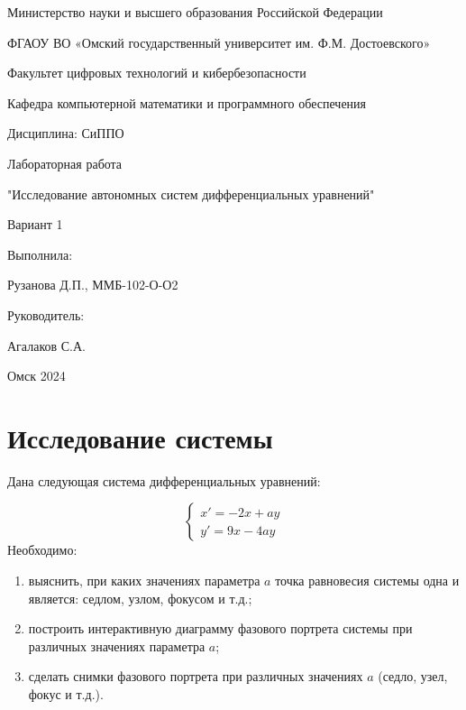 \documentclass[fleqn, 14pt]{article}
\begin{document}
\thispagestyle{empty}
\begin{center}
\setlength{\baselineskip}{8pt}

Министерство науки и высшего образования Российской Федерации

ФГАОУ ВО «Омский государственный университет им. Ф.М. Достоевского»

Факультет цифровых технологий и кибербезопасности

Кафедра компьютерной математики и программного обеспечения

Дисциплина: СиППО
\setlength{\baselineskip}{12pt}

\vspace*{15\baselineskip}
Лабораторная работа

"Исследование автономных систем дифференциальных уравнений"

Вариант 1
\end{center}
\vspace*{10\baselineskip}
\begin{flushright}
    Выполнила:

Рузанова Д.П., ММБ-102-О-О2

Руководитель:

Агалаков С.А.
\end{flushright}
\vspace*{6\baselineskip}
\begin{center}
Омск 2024    
\end{center}
\newpage
\tableofcontents
\newpage
\section{Исследование системы}
Дана следующая система дифференциальных
уравнений:

$$\begin{cases}
    x' = -2x + ay \\
    y' = 9x - 4ay
\end{cases}$$
Необходимо:
\begin{enumerate}
    \item выяснить, при каких значениях параметра $a$ точка равновесия системы одна и является: седлом, узлом, фокусом и т.д.;
    \item построить интерактивную диаграмму фазового портрета системы при различных значениях параметра $a$;
    \item сделать снимки фазового портрета при различных значениях $a$ (седло, узел, фокус и т.д.).
\end{enumerate}
\noindent
\end{document}
